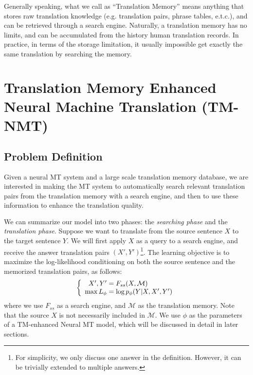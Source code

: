 \documentclass[11pt,letterpaper]{article}
\begin{document}
Generally speaking, what we call as ``Translation Memory'' means anything that stores raw translation knowledge (e.g. translation pairs, phrase tables, e.t.c.), and can be retrieved through a search engine. Naturally, a translation memory has no limits, and can be accumulated from the history human translation records. In practice, in terms of the storage limitation, it usually impossible get exactly the same translation by searching the memory. 


\section{Translation Memory Enhanced Neural Machine Translation (TM-NMT)}
\subsection{Problem Definition}
Given a neural MT system and a large scale translation memory database, we are interested in making the MT system to automatically search relevant translation pairs from the translation memory with a search engine, and then to use these information to enhance the translation quality. 

We can summarize our model into two phases: the \textit{searching phase} and the \textit{translation phase}.
Suppose we want to translate from the source sentence $X$ to the target sentence $Y$. We will first apply $X$ as a query to a search engine, and receive the answer translation pairs $(X', Y')$\footnote{For simplicity, we only discuss one answer in the definition. However, it can be trivially extended to multiple answers.}. The learning objective is to maximize the log-likelihood conditioning on both the source sentence and the memorized translation pairs, as follows:
\begin{equation}
\left\{
\begin{array}{r@{\;=\;}l}
X', Y' & F_{ss}(X, \mathcal{M})\\
\max L_\phi & \log p_\phi(Y|X, X', Y')
\end{array}
\right.
\end{equation}
where we use $F_{ss}$ as a search engine, and $\mathcal{M}$ as the translation memory. Note that the source $X$ is not necessarily included in $\mathcal{M}$. We use $\phi$ as the parameters of a TM-enhanced Neural MT model, which will be discussed in detail in later sections.
\end{document}
